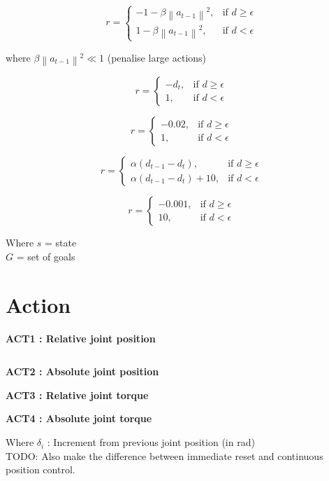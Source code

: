 \documentclass{article}
\newcommand{\norm}[1]{\left\lVert#1\right\rVert}
\begin{document}
\begin{equation}
r = \begin{cases}
    - 1 - \beta \norm{a_{t-1}}^2, & \text{if $d \geq \epsilon $}\\
    1 - \beta \norm{a_{t-1}}^2, & \text{if $d < \epsilon $}
  \end{cases}
\end{equation}

where $\beta \norm{a_{t-1}}^2 \ll 1$ (penalise large actions)

\begin{equation}
r = \begin{cases}
    - d_t , & \text{if $d \geq \epsilon $}\\
    1 , & \text{if $d < \epsilon $}
  \end{cases}
\end{equation}

\begin{equation}
r = \begin{cases}
    - 0.02 , & \text{if $d \geq \epsilon $}\\
    1 , & \text{if $d < \epsilon $}
  \end{cases}
\end{equation}

\begin{equation}
r = \begin{cases}
\alpha (d_{t-1} - d_t), & \text{if $d \geq \epsilon $}\\
\alpha (d_{t-1} - d_t) + 10, & \text{if $d < \epsilon $}
  \end{cases}
\end{equation}

\begin{equation}
r = \begin{cases}
    - 0.001 , & \text{if $d \geq \epsilon $}\\
    10 , & \text{if $d < \epsilon $}
  \end{cases}
\end{equation}


Where
$s$ = state \\
$G$ = set of goals \\


\section{Action}


\textbf{ACT1 : Relative joint position}

\begin{equation}
[\delta_1, \delta_2, \delta_3, \delta_4, \delta_5, \delta_6]
\end{equation}

\textbf{ACT2 : Absolute joint position}

\textbf{ACT3 : Relative joint torque}

\textbf{ACT4 : Absolute joint torque}

Where
$\delta_i$ : Increment from previous joint position (in rad) \\

TODO: Also make the difference between immediate reset and continuous position control.
\end{document}

